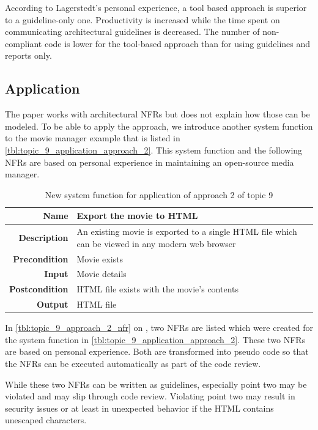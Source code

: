 According to Lagerstedt's personal experience, a tool based approach is superior to a guideline-only one.
Productivity is increased while the time spent on communicating architectural guidelines is decreased.
The number of non-compliant code is lower for the tool-based approach than for using guidelines and reports only.


\subsection{Application}

The paper works with architectural NFRs but does not explain how those can be modeled.
To be able to apply the approach, we introduce another system function to the movie manager example that is listed in \autoref{tbl:topic_9_application_approach_2}.
This system function and the following NFRs are based on personal experience in maintaining an open-source media manager.

\begin{table}[h!]
	\centering
	\caption{New system function for application of approach 2 of topic 9}
	\label{tbl:topic_9_application_approach_2}
	\begin{tabular}{r|p{}}
		\textbf{Name}          & Export the movie to HTML \\ \hline
		\textbf{Description}   & An existing movie is exported to a single HTML file which can be viewed in any modern web browser \\ \hline
		\textbf{Precondition}  & Movie exists \\ \hline
		\textbf{Input}         & Movie details \\ \hline
		\textbf{Postcondition} & HTML file exists with the movie's contents \\ \hline
		\textbf{Output}        & HTML file \\ \hline
	\end{tabular}
\end{table}

In \autoref{tbl:topic_9_approach_2_nfr} on , two NFRs are listed which were created for the system function in \autoref{tbl:topic_9_application_approach_2}. 
These two NFRs are based on personal experience.
Both are transformed into pseudo code so that the NFRs can be executed automatically as part of the code review.

While these two NFRs can be written as guidelines, especially point two may be violated and may slip through code review. Violating point two may result in security issues or at least in unexpected behavior if the HTML contains unescaped characters.

